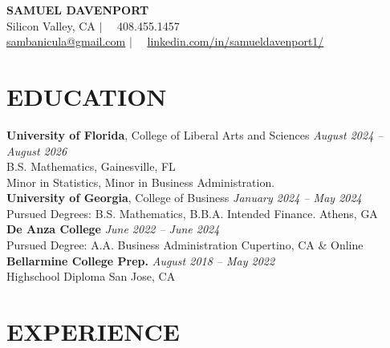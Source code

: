 \documentclass[11pt,letterpaper]{article}
\begin{document}
	
	\begin{center}
		{\Huge\bfseries SAMUEL DAVENPORT} \\[6pt]
		Silicon Valley, CA \quad $|\quad$ 408.455.1457 \\[4pt]
		\href{mailto:sambanicula@gmail.com}{sambanicula@gmail.com} \quad $|\quad$ 
		\href{https://www.linkedin.com/in/samueldavenport1/}{linkedin.com/in/samueldavenport1/}
	\end{center}
	
	\vspace{10pt}
	
	\section{EDUCATION}
	\textbf{University of Florida}, College of Liberal Arts and Sciences \hfill \textit{August 2024 -- August 2026} \\ 
	B.S. Mathematics, \hfill Gainesville, FL\\ \vspace{.2cm}
	Minor in Statistics, Minor in Business Administration. \\
	\textbf{University of Georgia}, College of Business \hfill \textit{January 2024 -- May 2024} \\ \vspace{.2cm}
	Pursued Degrees: B.S. Mathematics, B.B.A. Intended Finance. \hfill Athens, GA\\
	\textbf{De Anza College} \hfill \textit{June 2022 -- June 2024} \\ \vspace{.2cm}
	Pursued Degree: A.A. Business Administration \hfill Cupertino, CA \& Online\\
	\textbf{Bellarmine College Prep.} \hfill \textit{August 2018 -- May 2022} \\ \vspace{.2cm}
	Highschool Diploma \hfill San Jose, CA 
	
	
	\vspace{10pt}
	
	\section{EXPERIENCE}
	
\end{document}
